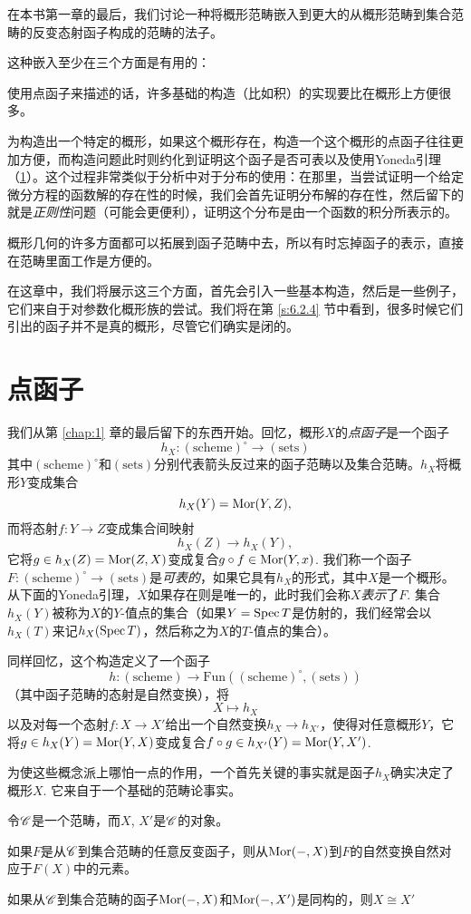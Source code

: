 在本书第一章的最后，我们讨论一种将概形范畴嵌入到更大的从概形范畴到集合范畴的反变态射函子构成的范畴的法子。

这种嵌入至少在三个方面是有用的：

\begin{compactenum}[(1)]
\item 使用点函子来描述的话，许多基础的构造（比如积）的实现要比在概形上方便很多。
\item 为构造出一个特定的概形，如果这个概形存在，构造一个这个概形的点函子往往更加方便，而构造问题此时则约化到证明这个函子是否可表以及使用Yoneda引理（\ref{s:6.1}）。这个过程非常类似于分析中对于分布的使用：在那里，当尝试证明一个给定微分方程的函数解的存在性的时候，我们会首先证明分布解的存在性，然后留下的就是\textit{正则性}问题（可能会更便利），证明这个分布是由一个函数的积分所表示的。
\item 概形几何的许多方面都可以拓展到函子范畴中去，所以有时忘掉函子的表示，直接在范畴里面工作是方便的。
\end{compactenum}

在这章中，我们将展示这三个方面，首先会引入一些基本构造，然后是一些例子，它们来自于对参数化概形族的尝试。我们将在第 \ref{s:6.2.4} 节中看到，很多时候它们引出的函子并不是真的概形，尽管它们确实是闭的。

\section{点函子}\label{s:6.1}

我们从第 \ref{chap:1} 章的最后留下的东西开始。回忆，概形$X$的\textit{点函子}是一个函子
\[
	h_X:(\text{scheme})^\circ \to (\text{sets})
\]
其中$(\text{scheme})^\circ$和$(\text{sets})$分别代表箭头反过来的函子范畴以及集合范畴。$h_X$将概形$Y$变成集合
\[
	h_X(Y)=\operatorname{Mor}(Y,Z),
\]
而将态射$f:Y\to Z$变成集合间映射
\[
	h_X(Z)\to h_X(Y),
\]
它将$g\in h_X(Z)=\operatorname{Mor}(Z,X)$变成复合$g\circ f\in \operatorname{Mor}(Y,x)$. 我们称一个函子$F:(\text{scheme})^\circ \to (\text{sets})$是\textit{可表的}，如果它具有$h_X$的形式，其中$X$是一个概形。从下面的Yoneda引理，$X$如果存在则是唯一的，此时我们会称$X$\textit{表示}了$F$. 集合$h_X(Y)$被称为$X$的$Y$-值点的集合（如果$Y=\operatorname{Spec} T$是仿射的，我们经常会以$h_X(T)$来记$h_X(\operatorname{Spec} T)$，然后称之为$X$的$T$-值点的集合）。

同样回忆，这个构造定义了一个函子
\[
	h:(\text{scheme})\to \mathrm{Fun}((\text{scheme})^\circ ,(\text{sets}))
\]
（其中函子范畴的态射是自然变换），将
\[
	X\mapsto h_X
\]
以及对每一个态射$f:X\to X'$给出一个自然变换$h_X\to h_{X'}$，使得对任意概形$Y$，它将$g\in h_X(Y)=\operatorname{Mor}(Y,X)$变成复合$f\circ g\in h_{X'}(Y)=\operatorname{Mor}(Y,X')$.

为使这些概念派上哪怕一点的作用，一个首先关键的事实就是函子$h_X$确实决定了概形$X$. 它来自于一个基础的范畴论事实。

\begin{lem}[Yoneda引理]
令$\mathscr{C}$是一个范畴，而$X$, $X'$是$\mathscr{C}$的对象。
\begin{compactenum}[(\rm a)]
\item 如果$F$是从$\mathscr{C}$到集合范畴的任意反变函子，则从$\operatorname{Mor}(-,X)$到$F$的自然变换自然对应于$F(X)$中的元素。
\item 如果从$\mathscr{C}$到集合范畴的函子$\operatorname{Mor}(-,X)$和$\operatorname{Mor}(-,X')$是同构的，则$X\cong X'$
\end{compactenum}
\end{lem}